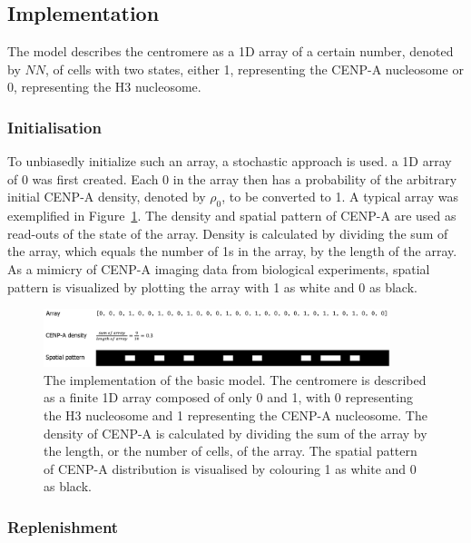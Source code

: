 \subsection{Implementation}

The model describes the centromere as a 1D array of a certain number, denoted by $NN$, of cells with two states, either 1, representing the CENP-A nucleosome or 0, representing the H3 nucleosome.

\subsubsection{Initialisation}

To unbiasedly initialize such an array, a stochastic approach is used. a 1D array of 0 was first created. Each 0 in the array then has a probability of the arbitrary initial CENP-A density, denoted by $\rho_{0}$, to be converted to 1. A typical array was exemplified in Figure~\ref{fig:array}. The density and spatial pattern of CENP-A are used as read-outs of the state of the  array. Density is calculated by dividing the sum of the array, which equals the number of 1s in the array, by the length of the array. As a mimicry of CENP-A imaging data from biological experiments, spatial pattern is visualized by plotting the array with 1 as white and 0 as black. \\

\begin{figure}[htbp]
  \centering
  \includegraphics[width=0.9\textwidth]{chapter2/figures/the array.pdf}
  \caption[The implementation of the basic model]{The implementation of the basic model. The centromere is described as a finite 1D array composed of only 0 and 1, with 0 representing the H3 nucleosome and 1 representing the CENP-A nucleosome. The density of CENP-A is calculated by dividing the sum of the array by the length, or the number of cells, of the array. The spatial pattern of CENP-A distribution is visualised by colouring 1 as white and 0 as black. }
  \label{fig:array}
\end{figure}

\subsubsection{Replenishment}

